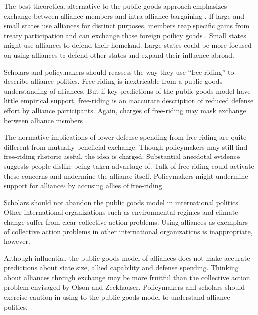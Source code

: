 \documentclass[12pt]{article}
\begin{document}
The best theoretical alternative to the public goods approach emphasizes exchange between alliance members and intra-alliance bargaining \citep{Norrlof2010, Brooksetal2013, Kim2016}. 
If large and small states use alliances for distinct purposes, members reap specific gains from treaty participation and can exchange those foreign poilicy goods \citep{Morrow1991, Johnson2015}. 
Small states might use alliances to defend their homeland. 
Large states could be more focused on using alliances to defend other states and expand their influence abroad. 


Scholars and policymakers should reassess the way they use ``free-riding'' to describe alliance politics. 
Free-riding is inextricable from a public goods understanding of alliances.
But if key predictions of the public goods model have little empirical support, free-riding is an inaccurate description of reduced defense effort by alliance participants.  
Again, charges of free-riding may mask exchange between alliance members \citep{Lanoszka2015}. 


The normative implications of lower defense spending from free-riding are quite different from mutually beneficial exchange. 
Though policymakers may still find free-riding rhetoric useful, the idea is charged. 
Substantial anecdotal evidence suggests people dislike being taken advantage of. 
Talk of free-riding could activate these concerns and undermine the alliance itself.
Policymakers might undermine support for alliances by accusing allies of free-riding. 


Scholars should not abandon the public goods model in international politics. 
Other international organizations such as environmental regimes and climate change suffer from clear collective action problems.  
Using alliances as exemplars of collective action problems in other international organizations is inappropriate, however. 


Although influential, the public goods model of alliances does not make accurate predictions about state size, allied capability and defense spending. 
Thinking about alliances through exchange may be more fruitful than the collective action problem envisaged by Olson and Zeckhauser.
Policymakers and scholars should exercise caution in using to the public goods model to understand alliance politics.  



\singlespace


 
\end{document}
